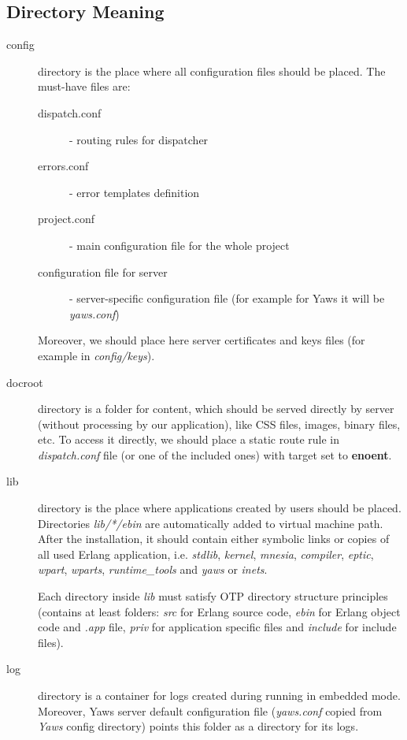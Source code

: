 \subsection{Directory Meaning}
\begin{description}
\item[config] directory is the place where all configuration files should be placed. The must-have files are:
\begin{description}
\item[dispatch.conf]- routing rules for dispatcher
\item[errors.conf]- error templates definition
\item[project.conf]- main configuration file for the whole project
\item[configuration file for server]- server-specific configuration file (for example for Yaws it will be {\it yaws.conf})
\end{description}

Moreover, we should place here server certificates and keys files (for example in {\it config/keys}).

\item[docroot] directory is a folder for content, which should be served directly by server (without processing by our application), like CSS files, images, binary files, etc. To access it directly, we should place a static route rule in {\it dispatch.conf} file (or one of the included ones) with target set to {\bf enoent}.

\item[lib] directory is the place where applications created by users should be placed. Directories {\it lib/*/ebin} are automatically added to virtual machine path. After the installation, it should contain either symbolic links or copies of all used Erlang application, i.e. {\it stdlib}, {\it kernel}, {\it mnesia}, {\it compiler}, {\it eptic}, {\it wpart}, {\it wparts}, {\it runtime\_tools} and {\it yaws} or {\it inets}.

Each directory inside {\it lib} must satisfy OTP directory structure principles (contains at least folders: {\it src} for Erlang source code, {\it ebin} for Erlang object code and {\it .app} file, {\it priv} for application specific files and {\it include} for include files).

\item[log] directory is a container for logs created during running in embedded mode. Moreover, Yaws server default configuration file ({\it yaws.conf} copied from {\it Yaws} config directory) points this folder as a directory for its logs.


\end{description}
